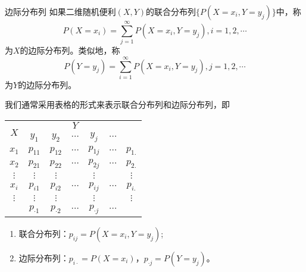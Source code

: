 \begin{definition}{边际分布列}\label{def:m.p.m.f}
如果二维随机便利$(X,Y)$的联合分布列$\{P(X=x_i,Y=y_j)\}$中，称
$$
P(X=x_i) = \sum_{j=1}^\infty P(X=x_i,Y=y_j) , i =1,2,\cdots
$$
为$X$的边际分布列。类似地，称
$$
P(Y=y_j) = \sum_{i=1}^\infty P(X=x_i,Y=y_j) , j =1,2,\cdots
$$
为$Y$的边际分布列。
\end{definition}
\begin{remark}
    我们通常采用表格的形式来表示联合分布列和边际分布列，即
    \begin{table}[ht]
    \centering
\begin{tabular}{c|ccccc|c}
\hline
\multirow{2}{*}{$X$}   &         &   & $Y$  &   &     &  \\ 
\cline{2-6} 
    & $y_{1}$ & $y_{2}$ &  $\cdots$ & $y_{j}$ & $\cdots$ &  \\ \hline
$x_{1}$   & $p_{11}$        & $p_{12}$   & $\cdots$   & $p_{1j}$   & $\cdots$     & $p_{1.}$ \\
$x_{2}$  &  $p_{21}$        & $p_{22}$   & $\cdots$    & $p_{2j}$   &$\cdots$     & $p_{2.}$  \\
$\vdots$ &    $\vdots$     & $\vdots$   &     &  $\vdots$  &     &  $\vdots$ \\
$x_{i}$   & $p_{i1}$         &  $p_{i2}$ &   $\cdots$ &  $p_{ij}$ & $\cdots$   & $p_{i.}$ \\
$\vdots$ &     $\vdots$     &  $\vdots$  &     & $\vdots$   &     &$\vdots$   \\ \hline
   &   $p_{\cdot 1}$      & $p_{\cdot 2}$  & $\cdots$    & $p_{\cdot j}$  &$\cdots$    & 
\end{tabular}
\end{table}
\begin{enumerate}
    \item 联合分布列：$p_{ij} = P(X=x_i,Y=y_j) $;
    \item 边际分布列：$p_{i\cdot} = P(X=x_i)$，$p_{\cdot j} = P(Y=y_j)$。
\end{enumerate}
\end{remark}




 
